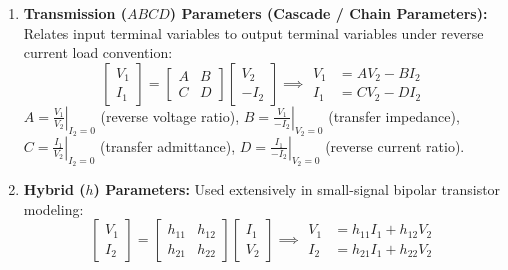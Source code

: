 \documentclass[12pt,a4paper]{article}
\begin{document}
\begin{tcolorbox}[defbox, title={\textbf{Definitions and Equations of Two-Port Parameter Sets}}]
\begin{enumerate}[leftmargin=*, itemsep=4pt]
  \item \textbf{Transmission ($ABCD$) Parameters (Cascade / Chain Parameters):}
  Relates input terminal variables to output terminal variables under reverse current load convention:
  \begin{equation}
    \begin{bmatrix} V_1 \\ I_1 \end{bmatrix} = \begin{bmatrix} A & B \\ C & D \end{bmatrix} \begin{bmatrix} V_2 \\ -I_2 \end{bmatrix} \implies \begin{aligned} V_1 &= A V_2 - B I_2 \\ I_1 &= C V_2 - D I_2 \end{aligned}
  \end{equation}
  $A = \left.\frac{V_1}{V_2}\right|_{I_2=0}$ (reverse voltage ratio), $B = \left.\frac{V_1}{-I_2}\right|_{V_2=0}$ (transfer impedance),\\
  $C = \left.\frac{I_1}{V_2}\right|_{I_2=0}$ (transfer admittance), $D = \left.\frac{I_1}{-I_2}\right|_{V_2=0}$ (reverse current ratio).

  \item \textbf{Hybrid ($h$) Parameters:}
  Used extensively in small-signal bipolar transistor modeling:
  \begin{equation}
    \begin{bmatrix} V_1 \\ I_2 \end{bmatrix} = \begin{bmatrix} h_{11} & h_{12} \\ h_{21} & h_{22} \end{bmatrix} \begin{bmatrix} I_1 \\ V_2 \end{bmatrix} \implies \begin{aligned} V_1 &= h_{11} I_1 + h_{12} V_2 \\ I_2 &= h_{21} I_1 + h_{22} V_2 \end{aligned}
  \end{equation}


\end{enumerate}
\end{tcolorbox}
\end{document}
